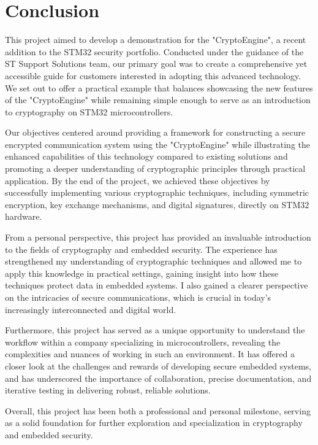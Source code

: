 \chapter*{Conclusion}

This project aimed to develop a demonstration for the "CryptoEngine", a recent addition to the STM32 security portfolio. Conducted under the guidance of the ST Support Solutions team, our primary goal was to create a comprehensive yet accessible guide for customers interested in adopting this advanced technology. We set out to offer a practical example that balances showcasing the new features of the "CryptoEngine" while remaining simple enough to serve as an introduction to cryptography on STM32 microcontrollers.

Our objectives centered around providing a framework for constructing a secure encrypted communication system using the "CryptoEngine" 
 while illustrating the enhanced capabilities of this technology compared to existing solutions and promoting a deeper understanding of cryptographic principles through practical application. By the end of the project, we achieved these objectives by successfully implementing various cryptographic techniques, including symmetric encryption, key exchange mechanisms, and digital signatures, directly on STM32 hardware.

From a personal perspective, this project has provided an invaluable introduction to the fields of cryptography and embedded security. The experience has strengthened my understanding of cryptographic techniques and allowed me to apply this knowledge in practical settings, gaining insight into how these techniques protect data in embedded systems. I also gained a clearer perspective on the intricacies of secure communications, which is crucial in today's increasingly interconnected and digital world.

Furthermore, this project has served as a unique opportunity to understand the workflow within a company specializing in microcontrollers, revealing the complexities and nuances of working in such an environment. It has offered a closer look at the challenges and rewards of developing secure embedded systems, and has underscored the importance of collaboration, precise documentation, and iterative testing in delivering robust, reliable solutions.

Overall, this project has been both a professional and personal milestone, serving as a solid foundation for further exploration and specialization in cryptography and embedded security.